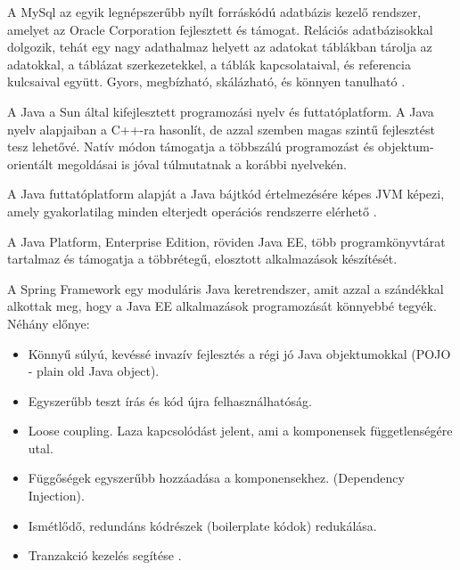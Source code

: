 



A MySql az egyik legnépszerűbb nyílt forráskódú adatbázis kezelő rendszer, amelyet az Oracle Corporation fejlesztett és támogat. Relációs adatbázisokkal dolgozik, tehát egy nagy adathalmaz helyett az adatokat táblákban tárolja az adatokkal, a táblázat szerkezetekkel, a táblák kapcsolataival, és referencia kulcsaival együtt. Gyors, megbízható, skálázható, és könnyen tanulható \cite{mysql}.

A Java a Sun által kifejlesztett programozási nyelv és futtatóplatform. A Java nyelv alapjaiban a C++-ra hasonlít, de azzal szemben magas szintű fejlesztést tesz lehetővé. Natív módon támogatja a többszálú programozást és objektum-orientált megoldásai is jóval túlmutatnak a korábbi nyelvekén.

A Java futtatóplatform alapját a Java bájtkód értelmezésére képes JVM képezi, amely gyakorlatilag minden elterjedt operációs rendszerre elérhető \cite{javaee}.

A Java Platform, Enterprise Edition, röviden Java EE, több programkönyvtárat tartalmaz és támogatja a többrétegű, elosztott alkalmazások készítését.

A Spring Framework egy moduláris Java keretrendszer, amit azzal a szándékkal alkottak meg, hogy a Java EE alkalmazások programozását könnyebbé tegyék. Néhány előnye:
\begin{itemize}
	\item Könnyű súlyú, kevéssé invazív fejlesztés a régi jó Java objektumokkal (POJO - plain old Java object).
	\item Egyszerűbb teszt írás és kód újra felhasználhatóság.
	\item Loose coupling. Laza kapcsolódást jelent, ami a komponensek függetlenségére utal.
	\item Függőségek egyszerűbb hozzáadása a komponensekhez. (Dependency Injection).
	\item Ismétlődő, redundáns kódrészek (boilerplate kódok) redukálása.
	\item Tranzakció kezelés segítése \cite{spring}.
\end{itemize}

